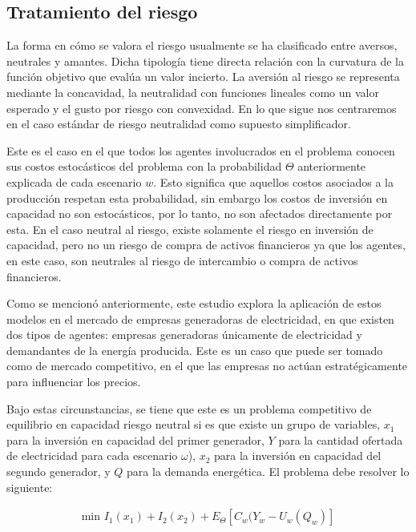 \subsection{Tratamiento del riesgo}

La forma en cómo se valora el riesgo usualmente se ha clasificado entre aversos, neutrales y amantes. Dicha tipología tiene directa relación con la curvatura de la función objetivo que evalúa un valor incierto. La aversión al riesgo se representa mediante la concavidad, la neutralidad con funciones lineales como un valor esperado y el gusto por riesgo con convexidad. En lo que sigue nos centraremos en el caso estándar de riesgo neutralidad como supuesto simplificador.

Este es el caso en el que todos los agentes involucrados en el problema conocen sus costos estocásticos del problema con la probabilidad $\Theta$ anteriormente explicada de cada escenario $w$. Esto significa que aquellos costos asociados a la producción respetan esta probabilidad, sin embargo los costos de inversión en capacidad no son estocásticos, por lo tanto, no son afectados directamente por esta. En el caso neutral al riesgo, existe solamente el riesgo en inversión de capacidad, pero no un riesgo de compra de activos financieros ya que los agentes, en este caso, son neutrales al riesgo de intercambio o compra de activos financieros. 
\vspace{2.5mm}

Como se mencionó anteriormente, este estudio explora la aplicación de estos modelos en el mercado de empresas generadoras de electricidad, en que existen dos tipos de agentes: empresas generadoras únicamente de electricidad y demandantes de la energía producida. Este es un caso que puede ser tomado como de mercado competitivo, en el que las empresas no actúan estratégicamente para influenciar los precios. 
\vspace{2.5mm}

Bajo estas circunstancias, se tiene que este es un problema competitivo de equilibrio en capacidad riesgo neutral si es que existe un grupo de variables, $x_{1}$ para la inversión en capacidad del primer generador, $Y$ para la cantidad ofertada de electricidad para cada escenario $\omega$), $x_{2}$ para la inversión en capacidad del segundo generador, y $Q$ para la demanda energética. El problema debe resolver lo siguiente: 

\begin{align}
 \text{min } I_{1}(x_{1})+ I_{2}(x_{2})+E_{\Theta}[C_{w}(Y_{w}-U_{w}(Q_{w})] \label{foejemplomaere}
\end{align}

